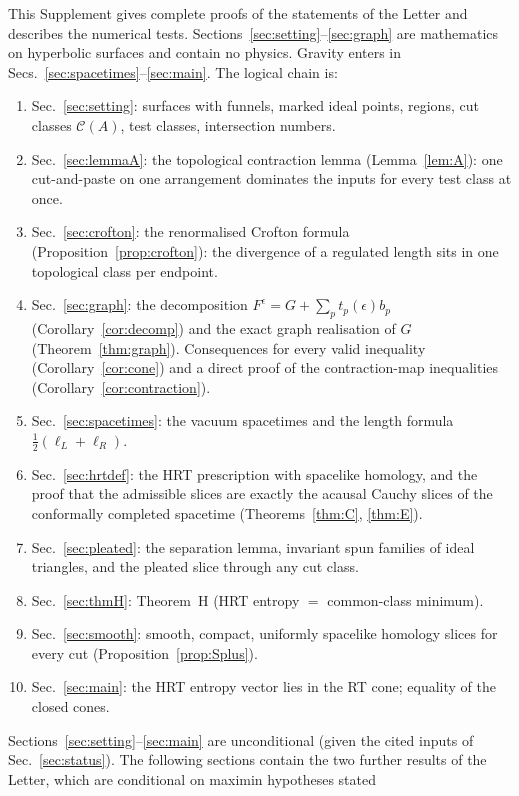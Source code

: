 \documentclass[aps,prd,onecolumn,superscriptaddress,nofootinbib,amsmath,amssymb,11pt]{revtex4-2}
\newcommand{\ScopeShort}{vacuum}
\theoremstyle{definition}
\newcommand{\Cut}{\mathcal{C}}
\newcommand{\eps}{\epsilon}
\begin{document}
This Supplement gives complete proofs of the statements of the Letter and describes the numerical tests.
Sections~\ref{sec:setting}--\ref{sec:graph} are mathematics on hyperbolic surfaces and contain no physics.
Gravity enters in Secs.~\ref{sec:spacetimes}--\ref{sec:main}. The logical chain is:
\begin{enumerate}
\item Sec.~\ref{sec:setting}: surfaces with funnels, marked ideal points, regions, cut classes $\Cut(A)$,
test classes, intersection numbers.
\item Sec.~\ref{sec:lemmaA}: the topological contraction lemma (Lemma~\ref{lem:A}): one cut-and-paste on one
arrangement dominates the inputs for every test class at once.
\item Sec.~\ref{sec:crofton}: the renormalised Crofton formula (Proposition~\ref{prop:crofton}): the
divergence of a regulated length sits in one topological class per endpoint.
\item Sec.~\ref{sec:graph}: the decomposition $F^\eps=G+\sum_pt_p(\eps)b_p$ (Corollary~\ref{cor:decomp}) and
the exact graph realisation of $G$ (Theorem~\ref{thm:graph}). Consequences for every valid inequality
(Corollary~\ref{cor:cone}) and a direct proof of the contraction-map inequalities (Corollary~\ref{cor:contraction}).
\item Sec.~\ref{sec:spacetimes}: the \ScopeShort{} spacetimes and the length formula $\frac12(\ell_L+\ell_R)$.
\item Sec.~\ref{sec:hrtdef}: the HRT prescription with spacelike homology, and the proof that the admissible
slices are exactly the acausal Cauchy slices of the conformally completed spacetime (Theorems~\ref{thm:C},
\ref{thm:E}).
\item Sec.~\ref{sec:pleated}: the separation lemma, invariant spun families of ideal triangles, and the
pleated slice through any cut class.
\item Sec.~\ref{sec:thmH}: Theorem~H (HRT entropy $=$ common-class minimum).
\item Sec.~\ref{sec:smooth}: smooth, compact, uniformly spacelike homology slices for every cut
(Proposition~\ref{prop:Splus}).
\item Sec.~\ref{sec:main}: the HRT entropy vector lies in the RT cone; equality of the closed cones.
\end{enumerate}
Sections~\ref{sec:setting}--\ref{sec:main} are unconditional (given the cited inputs of Sec.~\ref{sec:status}). The
following sections contain the two further results of the Letter, which are conditional on maximin hypotheses stated
\end{document}
